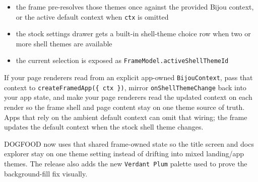 \begin{itemize}
\tightlist
\item
  the frame pre-resolves those themes once against the provided Bijou context, or the active default context when \texttt{c\allowbreak{}t\allowbreak{}x} is omitted
\item
  the stock settings drawer gets a built-in shell-theme choice row when two or more shell themes are available
\item
  the current selection is exposed as \texttt{F\allowbreak{}r\allowbreak{}a\allowbreak{}m\allowbreak{}e\allowbreak{}M\allowbreak{}o\allowbreak{}d\allowbreak{}e\allowbreak{}l\allowbreak{}.\allowbreak{}a\allowbreak{}c\allowbreak{}t\allowbreak{}i\allowbreak{}v\allowbreak{}e\allowbreak{}S\allowbreak{}h\allowbreak{}e\allowbreak{}l\allowbreak{}l\allowbreak{}T\allowbreak{}h\allowbreak{}e\allowbreak{}m\allowbreak{}e\allowbreak{}I\allowbreak{}d}
\end{itemize}

If your page renderers read from an explicit app-owned \texttt{B\allowbreak{}i\allowbreak{}j\allowbreak{}o\allowbreak{}u\allowbreak{}C\allowbreak{}o\allowbreak{}n\allowbreak{}t\allowbreak{}e\allowbreak{}x\allowbreak{}t}, pass that context to \texttt{c\allowbreak{}r\allowbreak{}e\allowbreak{}a\allowbreak{}t\allowbreak{}e\allowbreak{}F\allowbreak{}r\allowbreak{}a\allowbreak{}m\allowbreak{}e\allowbreak{}d\allowbreak{}A\allowbreak{}p\allowbreak{}p\allowbreak{}(\allowbreak{}\{\allowbreak{} \allowbreak{}c\allowbreak{}t\allowbreak{}x\allowbreak{} \allowbreak{}\}\allowbreak{})}, mirror \texttt{o\allowbreak{}n\allowbreak{}S\allowbreak{}h\allowbreak{}e\allowbreak{}l\allowbreak{}l\allowbreak{}T\allowbreak{}h\allowbreak{}e\allowbreak{}m\allowbreak{}e\allowbreak{}C\allowbreak{}h\allowbreak{}a\allowbreak{}n\allowbreak{}g\allowbreak{}e} back into your app state, and make your page renderers read the updated context on each render so the frame shell and page content stay on one theme source of truth. Apps that rely on the ambient default context can omit that wiring; the frame updates the default context when the stock shell theme changes.

DOGFOOD now uses that shared frame-owned state so the title screen and docs explorer stay on one theme setting instead of drifting into mixed landing/app themes. The release also adds the new \texttt{V\allowbreak{}e\allowbreak{}r\allowbreak{}d\allowbreak{}a\allowbreak{}n\allowbreak{}t\allowbreak{} \allowbreak{}P\allowbreak{}l\allowbreak{}u\allowbreak{}m} palette used to prove the background-fill fix visually.

